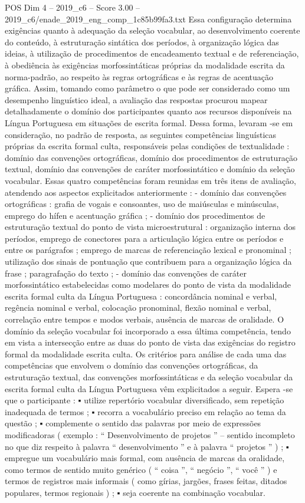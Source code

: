 \begin{textsample}{POS Dim 4 – 2019\_c6 – Score 3.00 – 2019\_c6/enade\_2019\_eng\_comp\_1c85b99fa3.txt}
Essa configuração determina exigências quanto à adequação da seleção vocabular, ao desenvolvimento coerente do conteúdo, à estruturação sintática dos períodos, à organização lógica das ideias, à utilização de procedimentos de encadeamento textual e de referenciação, à obediência às exigências morfossintáticas próprias da modalidade escrita da norma-padrão, ao respeito às regras ortográficas e às regras de acentuação gráfica.
Assim, tomando como parâmetro o que pode ser considerado como um desempenho linguístico ideal, a avaliação das respostas procurou mapear detalhadamente o domínio dos participantes quanto aos recursos disponíveis na Língua Portuguesa em situações de escrita formal.
Dessa forma, levaram -se em consideração, no padrão de resposta, as seguintes competências linguísticas próprias da escrita formal culta, responsáveis pelas condições de textualidade : domínio das convenções ortográficas, domínio dos procedimentos de estruturação textual, domínio das convenções de caráter morfossintático e domínio da seleção vocabular.
Essas quatro competências foram reunidas em três itens de avaliação, atendendo aos aspectos explicitados anteriormente : - domínio das convenções ortográficas : grafia de vogais e consoantes, uso de maiúsculas e minúsculas, emprego do hífen e acentuação gráfica ; - domínio dos procedimentos de estruturação textual do ponto de vista microestrutural : organização interna dos períodos, emprego de conectores para a articulação lógica entre os períodos e entre os parágrafos ; emprego de marcas de referenciação lexical e pronominal ; utilização dos sinais de pontuação que contribuem para a organização lógica da frase ; paragrafação do texto ; - domínio das convenções de caráter morfossintático estabelecidas como modelares do ponto de vista da modalidade escrita formal culta da Língua Portuguesa : concordância nominal e verbal, regência nominal e verbal, colocação pronominal, flexão nominal e verbal, correlação entre tempos e modos verbais, ausência de marcas de oralidade.
O domínio da seleção vocabular foi incorporado a essa última competência, tendo em vista a intersecção entre as duas do ponto de vista das exigências do registro formal da modalidade escrita culta.
Os critérios para análise de cada uma das competências que envolvem o domínio das convenções ortográficas, da estruturação textual, das convenções morfossintáticas e da seleção vocabular da escrita formal culta da Língua Portuguesa vêm explicitados a seguir.
Espera -se que o participante : {\EmojiFont ▪} utilize repertório vocabular diversificado, sem repetição inadequada de termos ; {\EmojiFont ▪} recorra a vocabulário preciso em relação ao tema da questão ; {\EmojiFont ▪} complemente o sentido das palavras por meio de expressões modificadoras ( exemplo : “ Desenvolvimento de projetos ” – sentido incompleto no que diz respeito à palavra “ desenvolvimento ” e à palavra “ projetos ” ) ; {\EmojiFont ▪} empregue um vocabulário mais formal, com ausência de marcas da oralidade, como termos de sentido muito genérico ( “ coisa ”, “ negócio ”, “ você ” ) e termos de registros mais informais ( como gírias, jargões, frases feitas, ditados populares, termos regionais ) ; {\EmojiFont ▪} seja coerente na combinação vocabular.

\end{textsample}

